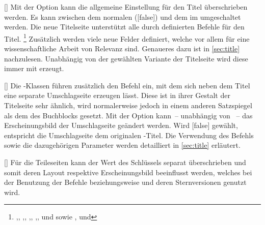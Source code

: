 \begin{Declaration}{[\PSet]}
\printdeclarationlist%
%
%
Mit der Option  kann die allgemeine Einstellung für den Titel 
überschrieben werden. Es kann zwischen dem normalen ([false]) 
und dem im \CD umgeschaltet werden. Die neue Titelseite unterstützt alle durch 
\KOMAScript{} definierten Befehle für den Titel.%
\footnote{\raggedright%
  ,,
  ,,
  ,,
  ,,
   und  sowie
  ,
  und 
}
Zusätzlich werden viele neue Felder definiert, welche vor allem für eine 
wissenschaftliche Arbeit von Relevanz sind. Genaueres dazu 
ist in \autoref{sec:title} nachzulesen. Unabhängig von der gewählten Variante 
der Titelseite wird diese immer mit  erzeugt.
\end{Declaration}

\begin{Declaration}[v2.02]{[\PSet]}
\printdeclarationlist%
%
%
%
Die \TUDScript-Klassen führen zusätzlich den Befehl  ein, mit 
dem sich neben dem Titel eine separate Umschlagseite erzeugen lässt. Diese ist 
in ihrer Gestalt der Titelseite sehr ähnlich, wird normalerweise jedoch in 
einem anderen Satzspiegel als dem des Buchblocks gesetzt. Mit der Option 
 kann~-- unabhängig von ~-- das Erscheinungsbild 
der Umschlagseite geändert werden. Wird [false] gewählt, 
entspricht die Umschlagseite dem originalen \KOMAScript-Titel. Die Verwendung 
des Befehls  sowie die dazugehörigen Parameter werden 
detailliert in \autoref{sec:title} erläutert.
\end{Declaration}

\begin{Declaration}{[\PSet]}
\printdeclarationlist%
%
%
Für die Teileseiten kann der Wert des Schlüssels  separat 
überschrieben und somit deren Layout respektive Erscheinungsbild beeinflusst 
werden, welches bei der Benutzung der Befehle  beziehungsweise 
 und deren Sternversionen genutzt wird.
\end{Declaration}

